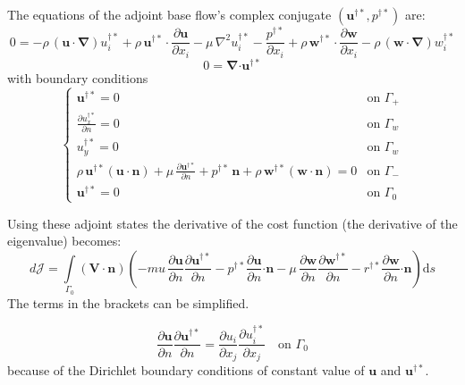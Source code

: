 \documentclass[12pt, a4paper]{article}
\begin{document}
The equations of the adjoint base flow's complex conjugate $(\mathbf{u^{\dagger*}}, p^{\dagger*})$ are:
\begin{equation}
0 = - \rho \, (\mathbf{u \cdot} \boldsymbol{\nabla}) u^{\dagger*}_i + 
\rho \, \mathbf{u^{\dagger*} \cdot} \frac{\partial \mathbf{u}}{\partial x_i} - 
\mu \, \nabla^2 u^{\dagger*}_i - 
\frac{p^{\dagger*}}{\partial x_i} + 
\rho \, \mathbf{w^{\dagger*} \cdot} \frac{\partial \mathbf{w}}{\partial x_i} - 
\rho \, (\mathbf{w \cdot} \boldsymbol{\nabla}) w^{\dagger*}_i
\end{equation}
\begin{equation}
0 = \boldsymbol{\nabla} \mathbf{\cdot u^{\dagger*}}
\end{equation}
with boundary conditions
\begin{equation}
\begin{cases}
\mathbf{u^{\dagger*}} = 0 & \text{on } \Gamma_+ \\
\frac{\partial u^{\dagger*}_x}{\partial n} = 0 & \text{on } \Gamma_w \\
u^{\dagger*}_y = 0 & \text{on } \Gamma_w \\
\rho \, \mathbf{u^{\dagger*}} (\mathbf{u \cdot n}) + \mu \, \frac{\partial \mathbf{u^{\dagger*}}}{\partial n} + 
p^{\dagger*} \, \mathbf{n} + \rho \, \mathbf{w^{\dagger*}} (\mathbf{w \cdot n}) = 0 & \text{on } \Gamma_- \\
\mathbf{u^{\dagger*}} = 0 & \text{on } \Gamma_0
\end{cases}
\end{equation}

Using these adjoint states the derivative of the cost function (the derivative of the eigenvalue) becomes:
\begin{equation}
d \mathcal{J} = \int\limits_{\Gamma_0} (\mathbf{V \cdot n}) \left( 
-mu \, \frac{\partial \mathbf{u}}{\partial n} \frac{\partial \mathbf{u^{\dagger*}}}{\partial n} - 
p^{\dagger*} \frac{\partial \mathbf{u}}{\partial n} \mathbf{\cdot n} - 
\mu \, \frac{\partial \mathbf{w}}{\partial n} \frac{\partial \mathbf{w^{\dagger*}}}{\partial n} - 
r^{\dagger*} \frac{\partial \mathbf{w}}{\partial n} \mathbf{\cdot n}
\right) \mathrm{d} s
\end{equation}
The terms in the brackets can be simplified.

\begin{equation*}
\frac{\partial \mathbf{u}}{\partial n} \frac{\partial \mathbf{u^{\dagger*}}}{\partial n} = 
\frac{\partial u_i}{\partial x_j} \frac{\partial u^{\dagger*}_i}{\partial x_j}
\quad \text{on } \Gamma_0
\end{equation*}
because of the Dirichlet boundary conditions of constant value of $\mathbf{u}$ and $\mathbf{u^{\dagger*}}$.
\end{document}
